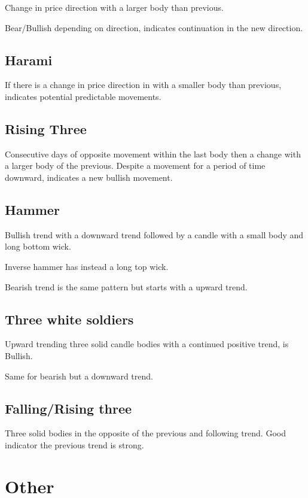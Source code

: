 \documentclass[11pt]{scrartcl} %
\begin{document}
Change in price direction with a larger body than previous.

Bear/Bullish depending on direction, indicates continuation in the new direction.

\subsection{Harami}

If there is a change in price direction in with a smaller body than previous, indicates potential 
predictable movements.

\subsection{Rising Three}

Consecutive days of opposite movement within the last body then a change with a larger body of the 
previous. Despite a movement for a period of time downward, indicates a new bullish movement.

\subsection{Hammer}

Bullish trend with a downward trend followed by a candle with a small body and long bottom wick.

Inverse hammer has instead a long top wick.

Bearish trend is the same pattern but starts with a upward trend.

\subsection{Three white soldiers}

Upward trending three solid candle bodies with a continued positive trend, is Bullish.

Same for bearish but a downward trend.

\subsection{Falling/Rising three}

Three solid bodies in the opposite of the previous and following trend. Good indicator the previous
trend is strong.

\section{Other}
\end{document}
